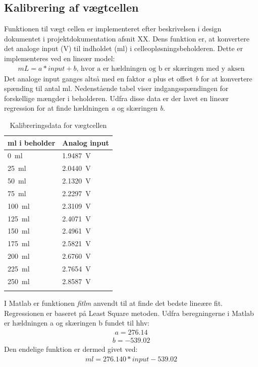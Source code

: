 \subsection{Kalibrering af vægtcellen}
Funktionen til vægt cellen er implementeret efter beskrivelsen i design dokumentet i projektdokumentation afsnit XX. Dens funktion er, at konvertere det analoge input (V) til indholdet (ml) i celleopløsningsbeholderen. Dette er implementeres ved en lineær model:
\begin{align}
mL = a*input+b \text{, hvor a er hældningen og b er skæringen med y aksen}
\end{align}
Det analoge input ganges altså med en faktor \textit{a} plus et offset \textit{b} for at konvertere spænding til antal ml. Nedenstående tabel viser indgangsspændingen for forskellige mængder i beholderen. Udfra disse data er der lavet en lineær regression for at finde hældningen \textit{a} og skæringen \textit{b}.
\begin{center}
		\begin{longtable}{ | m{3cm} | m{3cm}| } 
			\hline
			\textbf{ml i beholder} &\textbf{Analog input} \\ 
			\hline
			 \SI{0}{\milli\litre} & \SI{1.9487}{\volt} \\ 
			\hline
			 \SI{25}{\milli\litre} & \SI{2.0440}{\volt} \\ 
			\hline
			\SI{50}{\milli\litre} & \SI{2.1320}{\volt} \\ 
			\hline
			\SI{75}{\milli\litre} & \SI{2.2297}{\volt} \\ 
			\hline
			\SI{100}{\milli\litre} & \SI{2.3109}{\volt} \\ 
			\hline
			\SI{125}{\milli\litre} & \SI{2.4071}{\volt} \\ 
			\hline
			\SI{150}{\milli\litre} & \SI{2.4961}{\volt} \\ 
			\hline
			\SI{175}{\milli\litre} & \SI{2.5821}{\volt} \\ 
			\hline
			\SI{200}{\milli\litre} & \SI{2.6760}{\volt} \\ 
			\hline
			\SI{225}{\milli\litre} & \SI{2.7654}{\volt} \\ 
			\hline
			\SI{250}{\milli\litre} & \SI{2.8587}{\volt} \\ 
			\hline
			\caption{Kalibreringsdata for vægtcellen}
			 		\end{longtable}
\end{center}

I Matlab er funktionen \textit{fitlm} anvendt til at finde det bedste lineære fit. Regressionen er baseret på Least Square metoden. 
Udfra beregningerne i Matlab er hældningen a og skæringen b fundet til hhv:
\begin{align}
a = 276.14
\end{align}
\begin{align}
b = -539.02
\end{align}
Den endelige funktion er dermed givet ved:
\begin{align}
ml = 276.140*input-539.02
\end{align}

